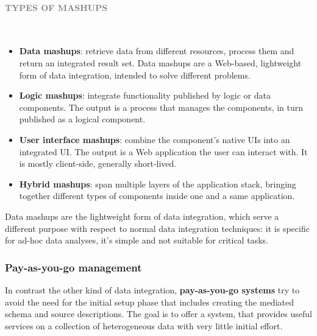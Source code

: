 \documentclass[10pt,a4paper]{article}
\newcommand{\myparagraph}[1]{\paragraph{\normalsize{\textcolor{gray}{\uppercase{\textbf{#1}}}} }\mbox{} \vspace{0.5em}\\}
\begin{document}
\begin{justify}
\myparagraph{Types of Mashups}
\begin{itemize}
	\item \textbf{Data mashups}: retrieve data from different resources, process them and return an integrated result set. Data mashups are a Web-based, lightweight form of data integration, intended to solve different problems.
	\item \textbf{Logic mashups}: integrate functionality published by logic or data components. The output is a process that manages the components, in turn published as a logical component.
	\item \textbf{User interface mashups}: combine the component’s native UIs into an integrated UI. The output is a Web application the user can interact with. It is mostly client-side, generally short-lived.
	\item \textbf{Hybrid mashups}: span multiple layers of the application stack, bringing together different types of components inside one and a same application.
\end{itemize}
Data mashups are the lightweight form of data integration, which serve a different purpose with respect to normal data integration techniques: it is specific for ad-hoc data analyses, it's simple and not suitable for critical tasks.
\subsubsection{Pay-as-you-go management}
In contrast the other kind of data integration, \textbf{pay-as-you-go systems} try to avoid the need for the initial setup phase that includes creating the mediated schema and source descriptions. The goal is to offer a system, that provides useful services on a collection of heterogeneous data with very little initial effort.

\end{justify}
\end{document}
